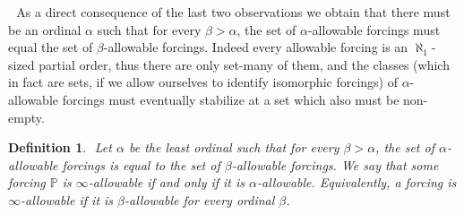 \documentclass[a4paper,11pt]{article}
\newtheorem{definition}[theorem]{Definition}
\newcommand{\forceP}{\mathbb{P}}
\begin{document}
    ﻿
    ﻿
    As a direct consequence of the last two observations we obtain that there must be an ordinal $\alpha$ such that for every $\beta> \alpha$, the set of $\alpha$-allowable forcings must equal the set of $\beta$-allowable forcings. Indeed every allowable forcing is an $\aleph_1$-sized partial order, thus there are only set-many of them, and the classes (which in fact are sets, if we allow ourselves to identify isomorphic forcings) of $\alpha$-allowable forcings must eventually stabilize at a set which also must be non-empty.
    ﻿
    ﻿
    \begin{definition}
    ﻿
    Let $\alpha$ be the least ordinal such that for every $\beta> \alpha$, the set of $\alpha$-allowable forcings is equal to the set of $\beta$-allowable forcings. We say that some forcing $\forceP$ is $\infty$-allowable if and only if it is $\alpha$-allowable. Equivalently, a forcing is $\infty$-allowable if it is $\beta$-allowable for every ordinal $\beta$.
    ﻿
    \end{definition}
    ﻿
    ﻿
  
    ﻿
    ﻿
\end{document}
